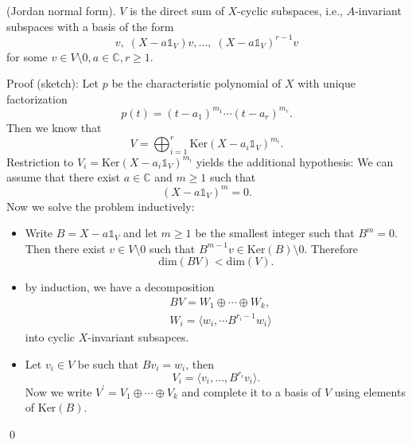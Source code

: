 \begin{dang}
\begin{theorem}
 (Jordan normal form).   $V$ is the direct sum of $X$-cyclic subspaces, i.e., $A$-invariant subspaces with a basis of the form 
    \begin{equation}
        v,\;(X-a\mathds{1}_V)v,\dots,\;(X-a\mathds{1}_V)^{r-1}v
    \end{equation}
    for some $v\in V\setminus0,a\in\mathbb{C},r\geq1$.
\end{theorem}
\end{dang}
Proof (sketch): Let $p$ be the characteristic polynomial of $X$ with unique factorization 
\begin{equation}
    p(t)=(t-a_1)^{m_1}\cdots(t-a_r)^{m_r}.
\end{equation}
Then we know that 
\begin{equation}
    V = \bigoplus_{i=1}^r\text{Ker}(X-a_i\mathds{1}_V)^{m_i}.
\end{equation}
Restriction to $V_i =\text{Ker}(X-a_i\mathds{1}_V)^{m_i}$ yields the additional hypothesis: We can assume that there exist 
$a\in\mathbb{C}$ and $m\geq1$ such that 
\begin{equation}
    (X-a\mathds{1}_V)^m=0.
\end{equation}
Now we solve the problem inductively:
\begin{itemize}
    \item Write $B=X-a\mathds{1}_V$ and let $m\geq1$ be the smallest integer such that $B^m=0$. Then there exist 
    $v\in V\setminus0$ such that $B^{m-1}v\in\text{Ker}(B)\setminus0$. Therefore
    \begin{equation}
        \text{dim}(BV)<\text{dim}(V).
    \end{equation}
    \item by induction, we have a decomposition
    \begin{equation}
        \begin{split}
             &BV = W_1\oplus \cdots\oplus W_k, \\
             &W_i=\langle w_i,\cdots B^{r_i-1}w_i \rangle
        \end{split}
    \end{equation}
    into cyclic $X$-invariant subsapces.
    \item Let $v_i\in V$ be such that $Bv_i=w_i$, then 
    \begin{equation}
        V_i=\langle v_i,\dots, B^{r_i}v_i\rangle.
    \end{equation}
    Now we write $V^\prime = V_1\oplus\cdots\oplus V_k$ and complete it to a basis of $V$ using elements of $\text{Ker}(B)$.
\end{itemize}
\qed

